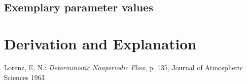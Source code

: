 \documentclass[10pt,a4paper]{article}
\begin{document}
	
	
	\subsection{Exemplary parameter values}
	

	
	\section{Derivation and Explanation} %
	
	
	\begin{thebibliography}{10}		
		Lorenz, E. N.: 
		\textit{Deterministic Nonperiodic Flow}, p. 135, Journal of Atmospheric Sciences 1963
	\end{thebibliography}
\end{document}
